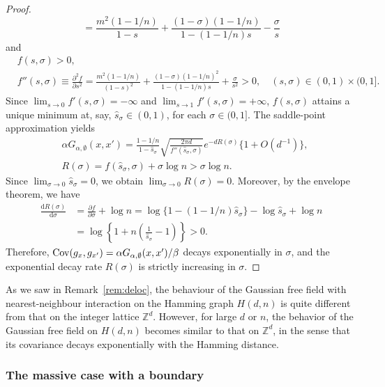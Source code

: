 \documentclass[a4paper,11pt]{article}
\theoremstyle{plain}
\theoremstyle{definition}
\begin{document}
\begin{proof}
\[  =\frac{m^2(1-1/n)}{1-s}+\frac{(1-\sigma)(1-1/n)}{1-(1-1/n)s}
  -\frac{\sigma}{s}
  \]
  and
  \begin{align*}
    &f(s,\sigma)>0,\\
    &f''(s,\sigma)\equiv\frac{\partial^2 f}{\partial s^2}
  =\frac{m^2(1-1/n)}{(1-s)^2}+\frac{(1-\sigma)(1-1/n)^2}{1-(1-1/n)s}
  +\frac{\sigma}{s^2}>0, \quad (s,\sigma)\in(0,1)\times(0,1].
  \end{align*}
  Since $\lim_{s\to 0}f'(s,\sigma)=-\infty$ and
  $\lim_{s\to 1}f'(s,\sigma)=+\infty$, $f(s,\sigma)$ attains
  a unique minimum at, say, $\hat{s}_{\sigma}\in(0,1)$, for
  each $\sigma\in(0,1]$. The saddle-point approximation yields
  \begin{align*}
    &\alpha G_{\alpha,\emptyset}(x,x')=
    \frac{1-1/n}{1-\hat{s}_\sigma}
    \sqrt{\frac{2\pi d}{f''(\hat{s}_\sigma,\sigma)}}
    e^{-dR(\sigma)}\{1+O(d^{-1})\},\\
    &R(\sigma)=f(\hat{s}_\sigma,\sigma)+\sigma\log n>\sigma\log n.
  \end{align*}
  Since $\lim_{\sigma\to 0}\hat{s}_\sigma=0$, we obtain
  $\lim_{\sigma\to 0} R(\sigma)=0$. Moreover, by the envelope
  theorem, we have
  \begin{align*}
    \frac{\mathrm{d}R(\sigma)}{\mathrm{d}\sigma}
    &=\frac{\partial f}{\partial\sigma}+\log n
    =\log\{1-(1-1/n)\hat{s}_\sigma\}-\log \hat{s}_\sigma+\log n\\
    &=\log\left\{1+n\left(\frac{1}{\hat{s}_\sigma}-1\right)\right\}
    >0.
  \end{align*}
  Therefore,
  ${\rm Cov}(g_x,g_{x'})=\alpha G_{\alpha,\emptyset}(x,x')/\beta$
  decays exponentially in $\sigma$, and the exponential decay
  rate $R(\sigma)$ is strictly increasing in $\sigma$.
\end{proof}  

As we saw in Remark~\ref{rem:deloc}, the behaviour
of the Gaussian free field with nearest-neighbour
interaction on the Hamming graph $H(d,n)$ is quite
different from that on the integer lattice $\mathbb{Z}^d$. 
However, for large $d$ or $n$, the behavior of the Gaussian
free field on $H(d,n)$ becomes similar to that on
$\mathbb{Z}^d$, in the sense that its covariance decays
exponentially with the Hamming distance.

\subsubsection{The massive case with a boundary}
\end{document}
